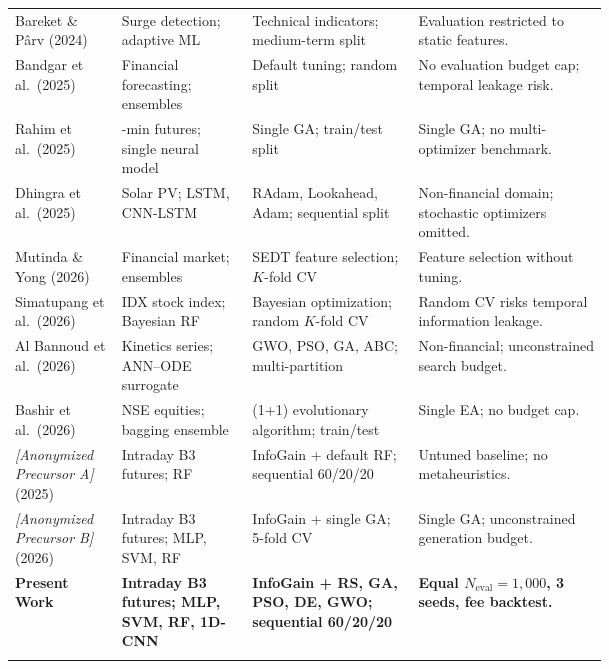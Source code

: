 \begin{table}[!htbp]
\begin{tabularx}{\linewidth}{@{}>{\raggedright\arraybackslash}p{0.18\linewidth} >{\raggedright\arraybackslash}p{0.22\linewidth} >{\raggedright\arraybackslash}p{0.29\linewidth} >{\raggedright\arraybackslash}X@{}}
Bareket \& P{\^a}rv (2024) \cite{bareket2024adaptive} & Surge detection; adaptive ML & Technical indicators; medium-term split & Evaluation restricted to static features. \\
Bandgar et al.\ (2025) \cite{bandgar2025finchronos} & Financial forecasting; ensembles & Default tuning; random split & No evaluation budget cap; temporal leakage risk. \\
Rahim et al.\ (2025) \cite{rahim2025technical} & 5-min futures; single neural model & Single GA; train/test split & Single GA; no multi-optimizer benchmark. \\
Dhingra et al.\ (2025) \cite{dhingra2025solar} & Solar PV; LSTM, CNN-LSTM & RAdam, Lookahead, Adam; sequential split & Non-financial domain; stochastic optimizers omitted. \\
Mutinda \& Yong (2026) \cite{mutinda2026hybrid} & Financial market; ensembles & SEDT feature selection; $K$-fold CV & Feature selection without tuning. \\
Simatupang et al.\ (2026) \cite{simatupang2026stock} & IDX stock index; Bayesian RF & Bayesian optimization; random $K$-fold CV & Random CV risks temporal information leakage. \\
Al Bannoud et al.\ (2026) \cite{al_bannoud2026accelerating} & Kinetics series; ANN--ODE surrogate & GWO, PSO, GA, ABC; multi-partition & Non-financial; unconstrained search budget. \\
Bashir et al.\ (2026) \cite{bashir2026evobagnet} & NSE equities; bagging ensemble & (1+1) evolutionary algorithm; train/test & Single EA; no budget cap. \\
\textit{[Anonymized Precursor A]} (2025) \cite{anonymous2025precursor} & Intraday B3 futures; RF & InfoGain + default RF; sequential 60/20/20 & Untuned baseline; no metaheuristics. \\
\textit{[Anonymized Precursor B]} (2026) \cite{anonymous2026precursor} & Intraday B3 futures; MLP, SVM, RF & InfoGain + single GA; 5-fold CV & Single GA; unconstrained generation budget. \\
\textbf{Present Work} & \textbf{Intraday B3 futures; MLP, SVM, RF, 1D-CNN} & \textbf{InfoGain + RS, GA, PSO, DE, GWO; sequential 60/20/20} & \textbf{Equal $N_{\mathrm{eval}}=1{,}000$, 3 seeds, fee backtest.} \\
\botrule
\end{tabularx}
\end{table}
\FloatBarrier

